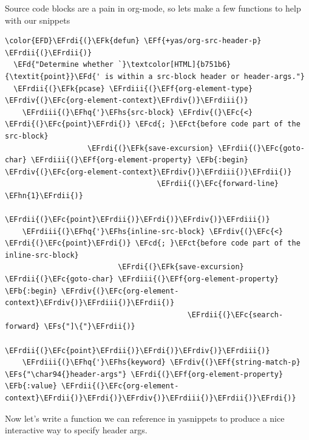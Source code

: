 \documentclass{scrartcl}
\newcommand{\EFk}[1]{\textcolor{EFk}{#1}} %
\newcommand{\EFd}[1]{\textcolor{EFd}{\textit{#1}}} %
\newcommand{\EFs}[1]{\textcolor{EFs}{#1}} %
\newcommand{\EFb}[1]{\textcolor{EFb}{#1}} %
\newcommand{\EFct}[1]{\textcolor{EFct}{#1}} %
\newcommand{\EFc}[1]{\textcolor{EFc}{#1}} %
\newcommand{\EFf}[1]{\textcolor{EFf}{#1}} %
\newcommand{\EFcd}[1]{\textcolor{EFcd}{#1}} %
\newcommand{\EFhn}[1]{\textcolor{EFhn}{\textbf{#1}}} %
\newcommand{\EFhq}[1]{\textcolor{EFhq}{#1}} %
\newcommand{\EFhs}[1]{\textcolor{EFhs}{#1}} %
\newcommand{\EFrdi}[1]{\textcolor{EFrdi}{#1}} %
\newcommand{\EFrdii}[1]{\textcolor{EFrdii}{#1}} %
\newcommand{\EFrdiii}[1]{\textcolor{EFrdiii}{#1}} %
\newcommand{\EFrdiv}[1]{\textcolor{EFrdiv}{#1}} %
\begin{document}
Source code blocks are a pain in org-mode, so lets make a few functions to help
with our snippets
\begin{Code}
\begin{Verbatim}[]
\color{EFD}\EFrdi{(}\EFk{defun} \EFf{+yas/org-src-header-p} \EFrdii{(}\EFrdii{)}
  \EFd{"Determine whether `}\textcolor[HTML]{b751b6}{\textit{point}}\EFd{' is within a src-block header or header-args."}
  \EFrdii{(}\EFk{pcase} \EFrdiii{(}\EFf{org-element-type} \EFrdiv{(}\EFc{org-element-context}\EFrdiv{)}\EFrdiii{)}
    \EFrdiii{(}\EFhq{'}\EFhs{src-block} \EFrdiv{(}\EFc{<} \EFrdi{(}\EFc{point}\EFrdi{)} \EFcd{; }\EFct{before code part of the src-block}
                   \EFrdi{(}\EFk{save-excursion} \EFrdii{(}\EFc{goto-char} \EFrdiii{(}\EFf{org-element-property} \EFb{:begin} \EFrdiv{(}\EFc{org-element-context}\EFrdiv{)}\EFrdiii{)}\EFrdii{)}
                                   \EFrdii{(}\EFc{forward-line} \EFhn{1}\EFrdii{)}
                                   \EFrdii{(}\EFc{point}\EFrdii{)}\EFrdi{)}\EFrdiv{)}\EFrdiii{)}
    \EFrdiii{(}\EFhq{'}\EFhs{inline-src-block} \EFrdiv{(}\EFc{<} \EFrdi{(}\EFc{point}\EFrdi{)} \EFcd{; }\EFct{before code part of the inline-src-block}
                          \EFrdi{(}\EFk{save-excursion} \EFrdii{(}\EFc{goto-char} \EFrdiii{(}\EFf{org-element-property} \EFb{:begin} \EFrdiv{(}\EFc{org-element-context}\EFrdiv{)}\EFrdiii{)}\EFrdii{)}
                                          \EFrdii{(}\EFc{search-forward} \EFs{"]\{"}\EFrdii{)}
                                          \EFrdii{(}\EFc{point}\EFrdii{)}\EFrdi{)}\EFrdiv{)}\EFrdiii{)}
    \EFrdiii{(}\EFhq{'}\EFhs{keyword} \EFrdiv{(}\EFf{string-match-p} \EFs{"\char94{}header-args"} \EFrdi{(}\EFf{org-element-property} \EFb{:value} \EFrdii{(}\EFc{org-element-context}\EFrdii{)}\EFrdi{)}\EFrdiv{)}\EFrdiii{)}\EFrdii{)}\EFrdi{)}
\end{Verbatim}
\end{Code}

Now let's write a function we can reference in yasnippets to produce a nice
interactive way to specify header args.
\end{document}
